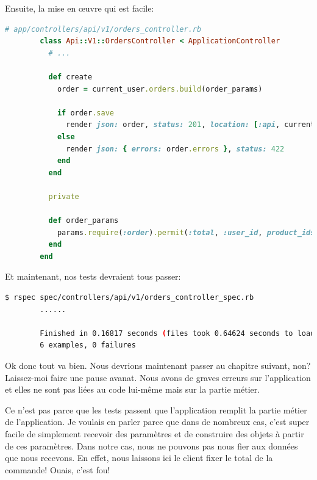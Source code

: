 \documentclass[]{report}
\begin{document}
      Ensuite, la mise en œuvre qui est facile:

      \begin{scriptsize}
        \begin{lstlisting}[language=ruby, caption={Création de l'action de création d'une commande}, label={lst:orders_controller_create}]
        # app/controllers/api/v1/orders_controller.rb
        class Api::V1::OrdersController < ApplicationController
          # ...

          def create
            order = current_user.orders.build(order_params)

            if order.save
              render json: order, status: 201, location: [:api, current_user, order]
            else
              render json: { errors: order.errors }, status: 422
            end
          end

          private

          def order_params
            params.require(:order).permit(:total, :user_id, product_ids: [])
          end
        end
        \end{lstlisting}
      \end{scriptsize}

      Et maintenant, nos tests devraient tous passer:

      \begin{scriptsize}
        \begin{lstlisting}[language=bash]
        $ rspec spec/controllers/api/v1/orders_controller_spec.rb
        ......

        Finished in 0.16817 seconds (files took 0.64624 seconds to load)
        6 examples, 0 failures
        \end{lstlisting}
      \end{scriptsize}

      Ok donc tout va bien. Nous devrions maintenant passer au chapitre suivant, non? Laissez-moi faire une pause avanat. Nous avons de graves erreurs sur l'application et elles ne sont pas liées au code lui-même mais sur la partie métier.

      Ce n'est pas parce que les tests passent que l'application remplit la partie métier de l'application. Je voulais en parler parce que dans de nombreux cas, c'est super facile de simplement recevoir des paramètres et de construire des objets à partir de ces paramètres. Dans notre cas, nous ne pouvons pas nous fier aux données que nous recevons. En effet, nous laissons ici le client fixer le total de la commande! Ouais, c'est fou!
\end{document}

